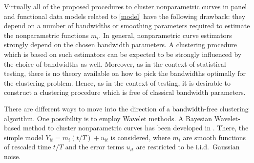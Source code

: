 \documentclass[a4paper,12pt]{article}
\begin{document}
\begin{itemize}[label=--,leftmargin=0.5cm]
Virtually all of the proposed procedures to cluster nonparametric curves in panel and functional data models related to \eqref{model} have the following drawback: they depend on a number of bandwidths or smoothing parameters required to estimate the nonparametric functions $m_i$. 
In general, nonparametric curve estimators strongly depend on the chosen bandwidth parameters. A clustering procedure which is based on such estimators can be expected to be strongly influenced by the choice of bandwidths as well. Moreover, as in the context of statistical testing, there is no theory available on how to pick the bandwidths optimally for the clustering problem. Hence, as in the context of testing, it is desirable to construct a clustering procedure which is free of classical bandwidth parameters. 


There are different ways to move into the direction of a bandwidth-free clustering algorithm. One possibility is to employ Wavelet methods. A Bayesian Wavelet-based method to cluster nonparametric curves has been developed in \cite{Ray2006}. There, the simple model $Y_{it} = m_i(t/T) + u_{it}$ is considered, where $m_i$ are smooth functions of rescaled time $t/T$ and the error terms $u_{it}$ are restricted to be i.i.d.\ Gaussian noise. 



\end{itemize}
\end{document}
